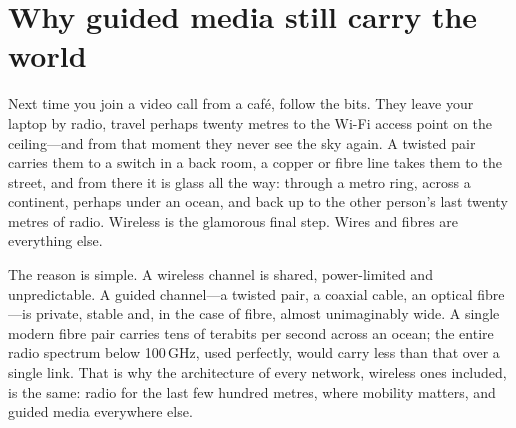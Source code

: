 \section{Why guided media still carry the world}
\label{sec:ch24:intro}

Next time you join a video call from a caf\'e, follow the bits. They leave your laptop by radio,
travel perhaps twenty metres to the Wi-Fi access point on the ceiling---and from that moment they
never see the sky again. A twisted pair carries them to a switch in a back room, a copper or fibre
line takes them to the street, and from there it is glass all the way: through a metro ring,
across a continent, perhaps under an ocean, and back up to the other person's last twenty metres
of radio. Wireless is the glamorous final step. Wires and fibres are everything else.

The reason is simple. A wireless channel is shared, power-limited and unpredictable. A guided
channel---a twisted pair, a coaxial cable, an optical fibre---is private, stable and, in the case
of fibre, almost unimaginably wide. A single modern fibre pair carries tens of terabits per second
across an ocean; the entire radio spectrum below 100\,GHz, used perfectly, would carry less than
that over a single link. That is why the architecture of every network, wireless ones included, is
the same: radio for the last few hundred metres, where mobility matters, and guided media
everywhere else.


